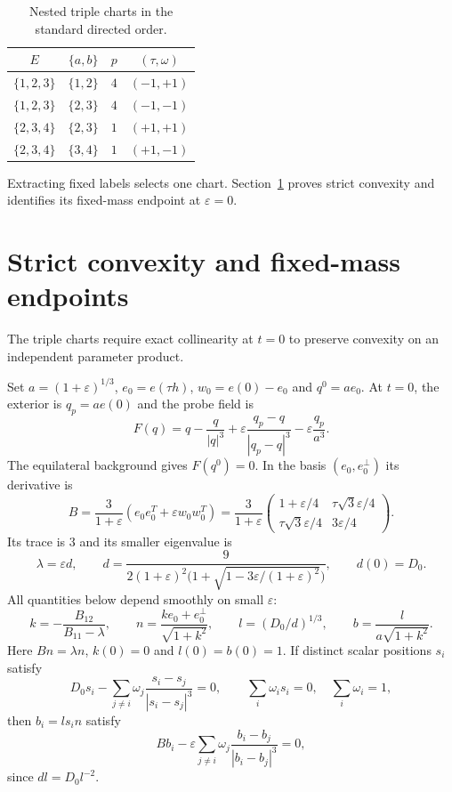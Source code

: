\documentclass[11pt,a4paper]{article}
\numberwithin{equation}{section}
\theoremstyle{remark}
\newcommand{\eps}{\varepsilon}
\begin{document}
\begin{table}[htbp]
\centering
\caption{Nested triple charts in the standard directed order.}\label{tab:nested}
\begin{tabular}{cccc}
\hline
$E$&$\{a,b\}$&$p$&$(\tau,\omega)$\\\hline
$\{1,2,3\}$&$\{1,2\}$&$4$&$(-1,+1)$\\
$\{1,2,3\}$&$\{2,3\}$&$4$&$(-1,-1)$\\
$\{2,3,4\}$&$\{2,3\}$&$1$&$(+1,+1)$\\
$\{2,3,4\}$&$\{3,4\}$&$1$&$(+1,-1)$\\\hline
\end{tabular}
\end{table}

Extracting fixed labels selects one chart. Section~\ref{sec:convexity} proves strict convexity and identifies its fixed-mass endpoint at $\eps=0$.

\section{Strict convexity and fixed-mass endpoints}
\label{sec:convexity}
The triple charts require exact collinearity at $t=0$ to preserve convexity on an independent parameter product.

Set $a=(1+\eps)^{1/3}$, $e_0=e(\tau h)$, $w_0=e(0)-e_0$ and $q^0=ae_0$.
At $t=0$, the exterior is $q_p=ae(0)$ and the probe field is
\[
 F(q)=q-\frac q{|q|^3}
      +\eps\frac{q_p-q}{|q_p-q|^3}-\eps\frac{q_p}{a^3}.
\]
The equilateral background gives $F(q^0)=0$. In the basis $(e_0,e_0^\perp)$ its derivative is
\begin{equation}\label{eq:bg-matrix}
 B=\frac3{1+\eps}(e_0e_0^T+\eps w_0w_0^T)
  =\frac3{1+\eps}
   \begin{pmatrix}1+\eps/4&\tau\sqrt3\eps/4\\
                   \tau\sqrt3\eps/4&3\eps/4\end{pmatrix}.
\end{equation}
Its trace is $3$ and its smaller eigenvalue is
\begin{equation}\label{eq:slow}
 \lambda=\eps d,\qquad
 d=\frac9{2(1+\eps)^2\bigl(1+\sqrt{1-3\eps/(1+\eps)^2}\bigr)},
 \qquad d(0)=D_0.
\end{equation}
All quantities below depend smoothly on small $\eps$:
\[
 k=-\frac{B_{12}}{B_{11}-\lambda},\qquad
 n=\frac{ke_0+e_0^\perp}{\sqrt{1+k^2}},\qquad
 l=(D_0/d)^{1/3},\qquad b=\frac{l}{a\sqrt{1+k^2}}.
\]
Here $Bn=\lambda n$, $k(0)=0$ and $l(0)=b(0)=1$.
If distinct scalar positions $s_i$ satisfy
\begin{equation}\label{eq:scalar-slow}
 D_0s_i-\sum_{j\ne i}\omega_j\frac{s_i-s_j}{|s_i-s_j|^3}=0,
 \qquad \sum_i\omega_i s_i=0,\quad\sum_i\omega_i=1,
\end{equation}
then $b_i=ls_i n$ satisfy
\begin{equation}\label{eq:vector-slow}
 Bb_i-\eps\sum_{j\ne i}\omega_j\frac{b_i-b_j}{|b_i-b_j|^3}=0,
\end{equation}
since $dl=D_0l^{-2}$.
\end{document}
